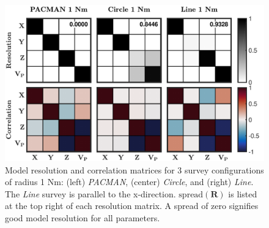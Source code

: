 \newpage

\begin{figure}[h]
\includegraphics[trim=0cm 0cm 0cm 0cm,clip=true,width=\columnwidth]{Figure07.pdf}
\caption{ Model resolution and correlation matrices for 3 survey configurations of radius 1 Nm: (left) \textit{PACMAN}, (center) \textit{Circle}, and (right) \textit{Line}. The \textit{Line} survey is parallel to the x-direction. $\text{spread}(\mathbf{R})$ is listed at the top right of each resolution matrix. A spread of zero signifies good model resolution for all parameters.}
\label{fig:resolution_correlation}
\end{figure}

\newpage

